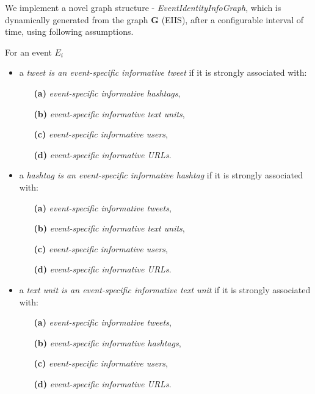 We implement a novel graph structure - \textit{EventIdentityInfoGraph}, which is dynamically generated from the graph $\mathbf{G}$ (EIIS), after a configurable interval of time, using following assumptions.
  
For an event $E_{i}$ 
\begin{itemize} 
\item a \textit{tweet is an event-specific informative tweet} if it is strongly associated with:
\begin{itemize}
\item[\textbf{(a)}] \textit{event-specific informative hashtags}, 
\item[\textbf{(b)}] \textit{event-specific informative text units}, 
\item[\textbf{(c)}] \textit{event-specific informative users},
\item[\textbf{(d)}] \textit{event-specific informative URLs}. 
\end{itemize}
\end{itemize}

\begin{itemize} 
\item a \textit{hashtag is an event-specific informative hashtag} if it is strongly associated with:
\begin{itemize}
\item[\textbf{(a)}] \textit{event-specific informative tweets},
\item[\textbf{(b)}] \textit{event-specific informative text units},
\item[\textbf{(c)}] \textit{event-specific informative users},
\item[\textbf{(d)}] \textit{event-specific informative URLs}.
\end{itemize}
\end{itemize}

\begin{itemize} 
\item a \textit{text unit is an event-specific informative text unit} if it is strongly associated with:
\begin{itemize}
\item[\textbf{(a)}] \textit{event-specific informative tweets}, 
\item[\textbf{(b)}] \textit{event-specific informative hashtags}, 
\item[\textbf{(c)}] \textit{event-specific informative users}, 
\item[\textbf{(d)}] \textit{event-specific informative URLs}. 
\end{itemize}
\end{itemize}

